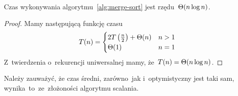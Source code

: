 \begin{fact}
    Czas wykonywania algorytmu~\ref{alg:merge-sort}
    jest rzędu~\( \Theta (n \log n) \).
\end{fact}
\begin{proof}
    Mamy następującą funkcję czasu
    \begin{equation}
        T(n) = \begin{cases}
            2T \left( \frac{n}{2} \right) + \Theta (n)
                & n > 1 \\
            \Theta(1) & n = 1 
        \end{cases}
    \end{equation}
    Z~twierdzenia o~rekurencji uniwersalnej
    mamy, że~\( T(n) = \Theta (n \log n) \).
\end{proof}

Należy zauważyć, że czas średni, zarówno~jak 
i~optymistyczny jest taki sam, 
wynika~to~ze~złożoności algorytmu scalania.

